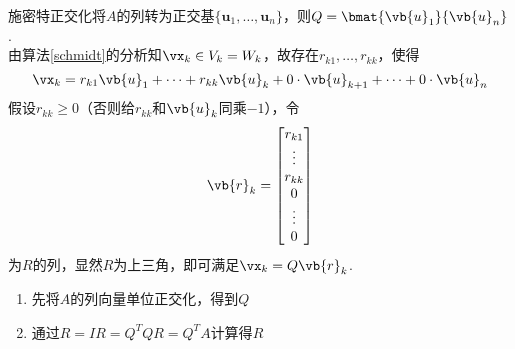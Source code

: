 \begin{analysis}
施密特正交化将$A$的列转为正交基$\{\mathbf{u}_1,\dots,\mathbf{u}_n\}$，则$Q=\bmat{\vb{u}_1}{\vb{u}_n}$.\\
由算法\ref{schmidt}的分析知$\vx_k\in V_k=W_k$，故存在$r_{k1},\dots,r_{kk}$，使得
\[\vx_k=r_{k1}\vb{u}_1+\cdots+r_{kk}\vb{u}_k+0\cdot\vb{u}_{k+1}+\cdots+0\cdot\vb{u}_n\]
假设$r_{kk}\geq 0$（否则给$r_{kk}$和$\vb{u}_k$同乘$-1$），令
\[\vb{r}_k=\begin{bmatrix}r_{k1}\\\vdots\\r_{kk}\\0\\\vdots\\0\end{bmatrix}\]
为$R$的列，显然$R$为上三角，即可满足$\vx_k=Q\vb{r}_k$.
\end{analysis}
\begin{myalgorithm}[QR分解]
\begin{enumerate}
	\itemsep -3pt
	\item 先将$A$的列向量单位正交化，得到$Q$
	\item 通过$R=IR=Q^TQR=Q^TA$计算得$R$
\end{enumerate}
\end{myalgorithm}